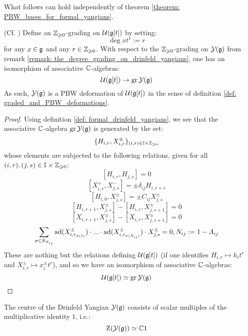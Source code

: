         What follows can hold independently of theorem \ref{theorem: PBW_bases_for_formal_yangians}. 
        \begin{lemma} \label{lemma: drinfeld_yangians_as_PBW_deformations}
            (Cf. \cite[Proposition 12.1.6]{chari_pressley_quantum_groups}) Define an $\mathbb{Z}_{\geqslant 0}$-grading on $\mathcal{U}(\mathfrak{g}[t])$ by setting:
                $$\deg x t^r := r$$
            for any $x \in \mathfrak{g}$ and any $r \in \mathbb{Z}_{\geqslant 0}$. With respect to the $\mathbb{Z}_{\geqslant 0}$-grading on $\mathcal{Y}(\mathfrak{g})$ from remark \ref{remark: the_degree_grading_on_drinfeld_yangians}, one has an isomorphism of associative $\mathbb{C}$-algebras:
                $$\mathcal{U}( \mathfrak{g}[t] ) \to \operatorname{gr} \mathcal{Y}(\mathfrak{g})$$
            As such, $\mathcal{Y}(\mathfrak{g})$ is a PBW deformation of $\mathcal{U}(\mathfrak{g}[t])$ in the sense of definition \ref{def: graded_and_PBW_deformations}.
        \end{lemma}
            \begin{proof}
                Using definition \ref{def: formal_drinfeld_yangians}, we see that the associative $\mathbb{C}$-algebra $\operatorname{gr} \mathcal{Y}(\mathfrak{g})$ is generated by the set:
                    $$\{ H_{i, r}, X_{i, r}^{\pm} \}_{(i ,r) \in \simpleroots \x \Z_{\geq 0}}$$
                whose elements are subjected to the following relations, given for all $(i, r), (j, s) \in \simpleroots \x \Z_{\geq 0}$:
                    $$[ H_{i, r}, H_{j, s} ] = 0$$
                    $$[ X_{i, r}^+, X_{j, s}^- ] = \pm \delta_{ij} H_{i, r + s}$$
                    $$[ H_{i, 0}, X_{j, s}^{\pm} ] = \pm C_{ij} X_{j, s}^{\pm}$$
                    $$[ H_{i, r + 1}, X_{j, s}^{\pm} ] - [ H_{i, r}, X_{j, s + 1}^{\pm} ] = 0$$
                    $$[ X_{i, r + 1}, X_{j, s}^{\pm} ] - [ X_{i, r}, X_{j, s + 1}^{\pm} ] = 0$$
                    $$\sum_{\sigma \in S_{N_{ij}}} \mathrm{ad}(X_{i, r_{\sigma(1)}}^{\pm}) \cdot ... \cdot \mathrm{ad}(X_{i, r_{\sigma(N_{ij})}}^{\pm}) \cdot X_{j, s}^{\pm} = 0, N_{ij} := 1 - A_{ij}$$
                These are nothing but the relations defining $\mathcal{U}( \mathfrak{g}[t] )$ (if one identifies $H_{i, r} \mapsto h_i t^r$ and $X_{i, r}^{\pm} \mapsto x_i^{\pm} t^r$), and so we have an isomorphism of associative $\mathbb{C}$-algebras:
                    $$\mathcal{U}( \mathfrak{g}[t] ) \simeq \operatorname{gr} \mathcal{Y}(\mathfrak{g})$$ 
            \end{proof}
        \begin{corollary} \label{coro: centres_of_drinfeld_yangians}
            The centre of the Drinfeld Yangian $\mathcal{Y}(\mathfrak{g})$ consists of scalar multiples of the multiplicative identity $1$, i.e.:
                $$\mathrm{Z}( \mathcal{Y}(\mathfrak{g}) ) \simeq \mathbb{C} 1$$
        \end{corollary}
